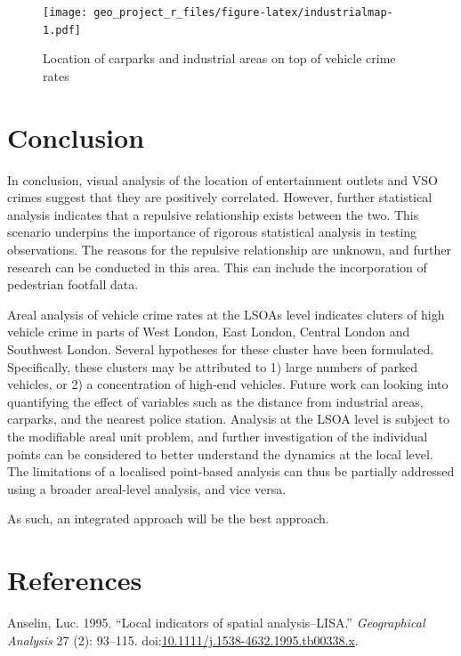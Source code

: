 \documentclass[]{article}
\begin{document}
\begin{figure}
\centering
\texttt{[image: geo\_project\_r\_files/figure-latex/industrialmap-1.pdf]}
\caption{\label{fig:industrialmap}Location of carparks and industrial areas
on top of vehicle crime rates}
\end{figure}

\pagebreak

\section{Conclusion}\label{conclusion}

In conclusion, visual analysis of the location of entertainment outlets
and VSO crimes suggest that they are positively correlated. However,
further statistical analysis indicates that a repulsive relationship
exists between the two. This scenario underpins the importance of
rigorous statistical analysis in testing observations. The reasons for
the repulsive relationship are unknown, and further research can be
conducted in this area. This can include the incorporation of pedestrian
footfall data.

Areal analysis of vehicle crime rates at the LSOAs level indicates
cluters of high vehicle crime in parts of West London, East London,
Central London and Southwest London. Several hypotheses for these
cluster have been formulated. Specifically, these clusters may be
attributed to 1) large numbers of parked vehicles, or 2) a concentration
of high-end vehicles. Future work can looking into quantifying the
effect of variables such as the distance from industrial areas,
carparks, and the nearest police station. Analysis at the LSOA level is
subject to the modifiable areal unit problem, and further investigation
of the individual points can be considered to better understand the
dynamics at the local level. The limitations of a localised point-based
analysis can thus be partially addressed using a broader areal-level
analysis, and vice versa.

As such, an integrated approach will be the best approach.

\pagebreak

\section{References}\label{references}

\hypertarget{refs}{}
\hypertarget{ref-Anselin1995}{}
Anselin, Luc. 1995. ``Local indicators of spatial analysis--LISA.''
\emph{Geographical Analysis} 27 (2): 93--115.
doi:\href{https://doi.org/10.1111/j.1538-4632.1995.tb00338.x}{10.1111/j.1538-4632.1995.tb00338.x}.
\end{document}
